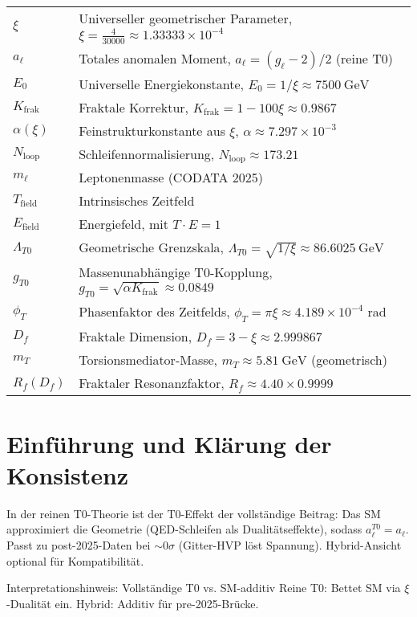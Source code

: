 \documentclass[12pt,a4paper]{article}
\begin{document}
	\begin{tabular}{ll}
		$\xi$ & Universeller geometrischer Parameter, $\xi = \frac{4}{30000} \approx 1.33333 \times 10^{-4}$ \\
		$a_\ell$ & Totales anomalen Moment, $a_\ell = (g_\ell - 2)/2$ (reine T0) \\
		$E_0$ & Universelle Energiekonstante, $E_0 = 1/\xi \approx \SI{7500}{\giga\electronvolt}$ \\
		$K_{\text{frak}}$ & Fraktale Korrektur, $K_{\text{frak}} = 1 - 100 \xi \approx 0.9867$ \\
		$\alpha(\xi)$ & Feinstrukturkonstante aus $\xi$, $\alpha \approx 7.297 \times 10^{-3}$ \\
		$N_{\text{loop}}$ & Schleifennormalisierung, $N_{\text{loop}} \approx 173.21$ \\
		$m_\ell$ & Leptonenmasse (CODATA 2025) \\
		$T_{\text{field}}$ & Intrinsisches Zeitfeld \\
		$E_{\text{field}}$ & Energiefeld, mit $T \cdot E = 1$ \\
		$\Lambda_{T0}$ & Geometrische Grenzskala, $\Lambda_{T0} = \sqrt{1/\xi} \approx \SI{86.6025}{\giga\electronvolt}$ \\
		$g_{T0}$ & Massenunabhängige T0-Kopplung, $g_{T0} = \sqrt{\alpha K_{\text{frak}}} \approx 0.0849$ \\
		$\phi_T$ & Phasenfaktor des Zeitfelds, $\phi_T = \pi \xi \approx 4.189 \times 10^{-4}$ rad \\
		$D_f$ & Fraktale Dimension, $D_f = 3 - \xi \approx 2.999867$ \\
		$m_T$ & Torsionsmediator-Masse, $m_T \approx \SI{5.81}{\giga\electronvolt}$ (geometrisch) \\
		$R_f(D_f)$ & Fraktaler Resonanzfaktor, $R_f \approx 4.40 \times 0.9999$ \\
	\end{tabular}
	
	\section{Einführung und Klärung der Konsistenz}
	In der reinen T0-Theorie \cite{T0_SI} ist der T0-Effekt der vollständige Beitrag: Das SM approximiert die Geometrie (QED-Schleifen als Dualitätseffekte), sodass $a_\ell^{T0} = a_\ell$. Passt zu post-2025-Daten bei $\sim 0\sigma$ (Gitter-HVP löst Spannung). Hybrid-Ansicht optional für Kompatibilität.
	
	\begin{interpretation}{Interpretationshinweis: Vollständige T0 vs. SM-additiv}
		Reine T0: Bettet SM via $\xi$-Dualität ein. Hybrid: Additiv für pre-2025-Brücke.
	\end{interpretation}
	
\end{document}
